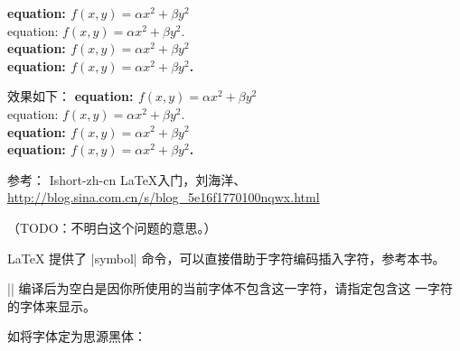 \begin{itemize}
\begin{texlist}
  {\bfseries equation: $f(x,y) = \alpha x^2 + \beta y^2$}\\
  equation: $f(x,y) = \alpha x^2 + \beta y^2$.\\
  \bfseries equation: $f(x,y) = \alpha x^2 + \beta y^2$\\
  equation: $f(x,y) = \alpha x^2 + \beta y^2$.\\
  
  \end{texlist}
  效果如下：
  {\bfseries equation: $f(x,y) = \alpha x^2 + \beta y^2$}\\
  equation: $f(x,y) = \alpha x^2 + \beta y^2$.\\
  \bfseries equation: $f(x,y) = \alpha x^2 + \beta y^2$\\
  equation: $f(x,y) = \alpha x^2 + \beta y^2$.\\
\end{itemize}
  参考： Ishort-zh-cn LaTeX入门，刘海洋、\url{http://blog.sina.com.cn/s/blog_5e16f1770100nqwx.html}




（TODO：不明白这个问题的意思。）





\LaTeX{} 提供了 |symbol| 命令，可以直接借助于字符编码插入字符，参考本书。

|| 编译后为空白是因你所使用的当前字体不包含这一字符，请指定包含这
一字符的字体来显示。

如将字体定为思源黑体：
\begin{texlist}
\newCJKfontfamily{} 
\cjksans {} 
\end{texlist}





